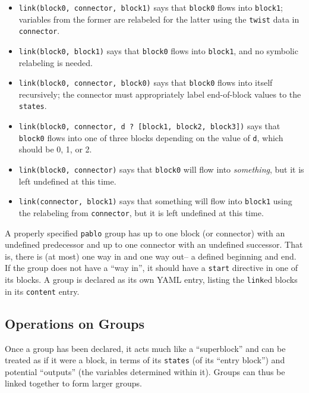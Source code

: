 \documentclass[12pt,pdftex,letterpaper]{article}
\begin{document}
\begin{itemize}
	\item \texttt{link(block0, connector, block1)} says that \texttt{block0} flows into \texttt{block1}; variables from the former are relabeled for the latter using the \texttt{twist} data in \texttt{connector}.
	
	\item \texttt{link(block0, block1)} says that \texttt{block0} flows into \texttt{block1}, and no symbolic relabeling is needed.
	
	\item \texttt{link(block0, connector, block0)} says that \texttt{block0} flows into itself recursively; the connector must appropriately label end-of-block values to the \texttt{states}.
	
	\item \texttt{link(block0, connector, d ? [block1, block2, block3])} says that \texttt{block0} flows into one of three blocks depending on the value of \texttt{d}, which should be 0, 1, or 2.
		
	\item \texttt{link(block0, connector)} says that \texttt{block0} will flow into \textit{something}, but it is left undefined at this time.
	
	\item \texttt{link(connector, block1)} says that something will flow into \texttt{block1} using the relabeling from \texttt{connector}, but it is left undefined at this time.
	
\end{itemize}

A properly specified \texttt{pablo} group has up to one block (or connector) with an undefined predecessor and up to one connector with an undefined successor. That is, there is (at most) one way in and one way out-- a defined beginning and end. If the group does not have a ``way in'', it should have a \texttt{start} directive in one of its blocks. A group is declared as its own YAML entry, listing the \texttt{link}ed blocks in its \texttt{content} entry.

\subsection{Operations on Groups}

Once a group has been declared, it acts much like a ``superblock'' and can be treated as if it were a block, in terms of its \texttt{states} (of its ``entry block'') and potential ``outputs'' (the variables determined within it). Groups can thus be linked together to form larger groups.
\end{document}
